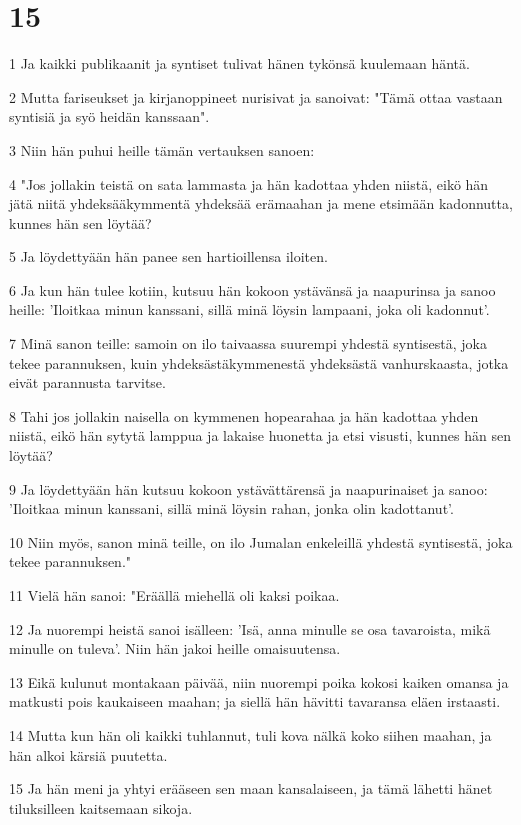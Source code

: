 \chapter{15}

\par 1 Ja kaikki publikaanit ja syntiset tulivat hänen tykönsä kuulemaan häntä.
\par 2 Mutta fariseukset ja kirjanoppineet nurisivat ja sanoivat: "Tämä ottaa vastaan syntisiä ja syö heidän kanssaan".
\par 3 Niin hän puhui heille tämän vertauksen sanoen:
\par 4 "Jos jollakin teistä on sata lammasta ja hän kadottaa yhden niistä, eikö hän jätä niitä yhdeksääkymmentä yhdeksää erämaahan ja mene etsimään kadonnutta, kunnes hän sen löytää?
\par 5 Ja löydettyään hän panee sen hartioillensa iloiten.
\par 6 Ja kun hän tulee kotiin, kutsuu hän kokoon ystävänsä ja naapurinsa ja sanoo heille: 'Iloitkaa minun kanssani, sillä minä löysin lampaani, joka oli kadonnut'.
\par 7 Minä sanon teille: samoin on ilo taivaassa suurempi yhdestä syntisestä, joka tekee parannuksen, kuin yhdeksästäkymmenestä yhdeksästä vanhurskaasta, jotka eivät parannusta tarvitse.
\par 8 Tahi jos jollakin naisella on kymmenen hopearahaa ja hän kadottaa yhden niistä, eikö hän sytytä lamppua ja lakaise huonetta ja etsi visusti, kunnes hän sen löytää?
\par 9 Ja löydettyään hän kutsuu kokoon ystävättärensä ja naapurinaiset ja sanoo: 'Iloitkaa minun kanssani, sillä minä löysin rahan, jonka olin kadottanut'.
\par 10 Niin myös, sanon minä teille, on ilo Jumalan enkeleillä yhdestä syntisestä, joka tekee parannuksen."
\par 11 Vielä hän sanoi: "Eräällä miehellä oli kaksi poikaa.
\par 12 Ja nuorempi heistä sanoi isälleen: 'Isä, anna minulle se osa tavaroista, mikä minulle on tuleva'. Niin hän jakoi heille omaisuutensa.
\par 13 Eikä kulunut montakaan päivää, niin nuorempi poika kokosi kaiken omansa ja matkusti pois kaukaiseen maahan; ja siellä hän hävitti tavaransa eläen irstaasti.
\par 14 Mutta kun hän oli kaikki tuhlannut, tuli kova nälkä koko siihen maahan, ja hän alkoi kärsiä puutetta.
\par 15 Ja hän meni ja yhtyi erääseen sen maan kansalaiseen, ja tämä lähetti hänet tiluksilleen kaitsemaan sikoja.
